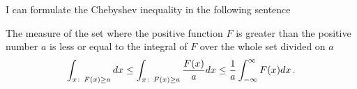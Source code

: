 

\baselineskip=14pt
\def\vare {\varepsilon}
\def\t {\tilde}
\def\a {\alpha}
\def\K {{\bf K}}
\def\N {{\bf N}}
\def\C {{\cal C}}
\def\L {{\cal L}}
\def\E {{\cal E}}
\def\s {{\sigma}}
\def\S {{\Sigma}}
\def\p{\partial}
\def\vare{{\varepsilon}}
\def\Q {{\bf Q}}
\def\D {{\cal D}}
\def\G {{\Gamma}}
\def\Z {{\bf Z}}
\def\R  {{\bf R}}
\def\l {\lambda}
\def\ll {{\bf l}}
\def\degree {{\bf {\rm degree}\,\,}}
\def \finish {${\,\,\vrule height1mm depth2mm width 8pt}$}
\def \m {\medskip}
\def\p {\partial}
\def\r {{\bf r}}
\def\pt {{\bf p}}
\def\v {{\bf v}}
\def\n {{\bf n}}
\def\t {{\bf t}}
\def\b {{\bf b}}
\def\c {{\bf c }}
\def\e{{\bf e}}
\def\ac {{\bf a}}
\def \X   {{\bf X}}
\def \Y   {{\bf Y}}
\def \x   {{\bf x}}
\def \y   {{\bf y}}
\def\w {{\omega}}
\def \Tr  {{\rm Tr\,}}
\def\dim {{\rm dim\,\,}}
\def\t {{\tilde}} 

I can formulate the Chebyshev inequality in the following  sentence

  The measure of the set where the positive function $F$  is greater than
   the positive number $a$ is less or equal to the integral of $F$ over 
the whole set
divided on $a$ 
           $$
\int_{x\colon\, F(x)\geq a}dx\leq
\int_{x\colon\, F(x)\geq a}{F(x)\over a}dx\leq
{1\over a}\int^\infty_{-\infty} F(x)dx\,.
           $$



\bye 
